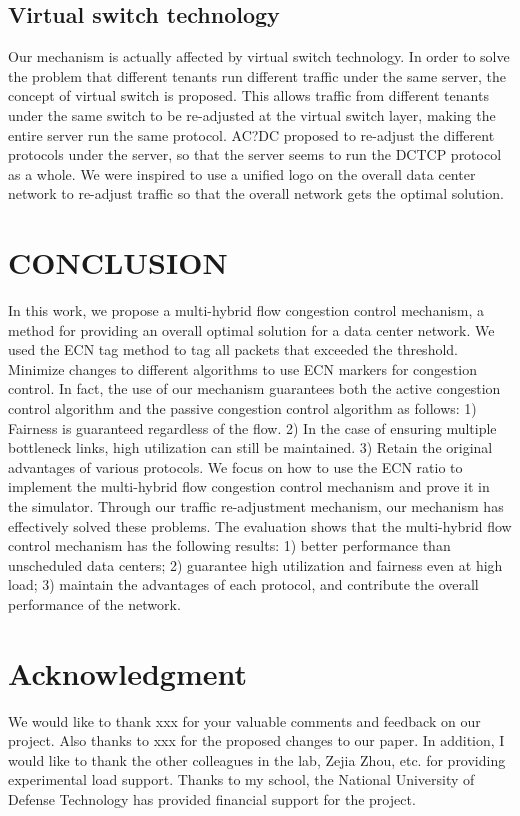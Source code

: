 \documentclass[conference]{IEEEtran}
\begin{document}
\subsection{Virtual switch technology}Our mechanism is actually affected by virtual switch technology. In order to solve the problem that different tenants run different traffic under the same server, the concept of virtual switch is proposed. This allows traffic from different tenants under the same switch to be re-adjusted at the virtual switch layer, making the entire server run the same protocol. AC?DC proposed to re-adjust the different protocols under the server, so that the server seems to run the DCTCP protocol as a whole. We were inspired to use a unified logo on the overall data center network to re-adjust traffic so that the overall network gets the optimal solution.
\section{CONCLUSION}
In this work, we propose a multi-hybrid flow congestion control mechanism, a method for providing an overall optimal solution for a data center network. We used the ECN tag method to tag all packets that exceeded the threshold. Minimize changes to different algorithms to use ECN markers for congestion control. In fact, the use of our mechanism guarantees both the active congestion control algorithm and the passive congestion control algorithm as follows: 1) Fairness is guaranteed regardless of the flow. 2) In the case of ensuring multiple bottleneck links, high utilization can still be maintained. 3) Retain the original advantages of various protocols. We focus on how to use the ECN ratio to implement the multi-hybrid flow congestion control mechanism and prove it in the simulator. Through our traffic re-adjustment mechanism, our mechanism has effectively solved these problems. The evaluation shows that the multi-hybrid flow control mechanism has the following results: 1) better performance than unscheduled data centers; 2) guarantee high utilization and fairness even at high load; 3) maintain the advantages of each protocol, and contribute the overall performance of the network.
\section*{Acknowledgment}

We would like to thank xxx for your valuable comments and feedback on our project. Also thanks to xxx for the proposed changes to our paper. In addition, I would like to thank the other colleagues in the lab, Zejia Zhou, etc. for providing experimental load support. Thanks to my school, the National University of Defense Technology has provided financial support for the project.
\end{document}
